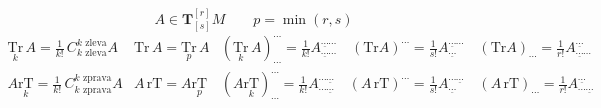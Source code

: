 \[
  A\in\mathbf{T}^{[r]}_{[s]}M \qquad p = \min(r,s)
\]
\[
  \begin{array}{lll}
    \underset{k}{\mathrm{Tr}}\,A = \frac1{k!}\,C^{k\text{ zleva}}_{k\text{ zleva}}A &
    \mathrm{Tr}\,A = \underset{p}{\mathrm{Tr}}\,A &
    (\underset{k}{\mathrm{Tr}}\,A)^{\cdots}_{\cdots} = \frac1{k!}A^{\underline{\cdots}\cdots}_{\underline{\cdots}\cdots} \quad
    (\mathrm{Tr}A)^{\cdots} = \frac1{s!}A^{\underline{\cdots}\cdots}_{\underline{\cdots}} \quad
    (\mathrm{Tr}A)_{\cdots} = \frac1{r!}A^{\underline{\cdots}}_{\underline{\cdots}\cdots} \\[6pt]
    A\underset{k}{\mathrm{rT}} = \frac1{k!}\,C^{k\text{ zprava}}_{k\text{ zprava}}A &
    A\,\mathrm{rT} = A\underset{p}{\mathrm{rT}} &
    (A\underset{k}{\mathrm{rT}})^{\cdots}_{\cdots} = \frac1{k!}A^{\cdots\underline{\cdots}}_{\cdots\underline{\cdots}} \quad
    (A\,\mathrm{rT})^{\cdots} = \frac1{s!}A^{\cdots\underline{\cdots}}_{\underline{\cdots}} \quad
    (A\,\mathrm{rT})_{\cdots} = \frac1{r!}A^{\underline{\cdots}}_{\cdots\underline{\cdots}}
  \end{array}
\]

